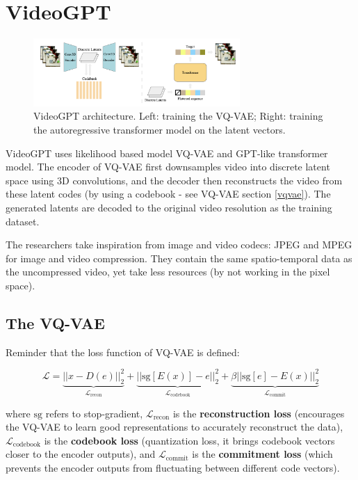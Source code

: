 \section{VideoGPT}
\label{sec:videogpt}

\begin{figure}
    \centering
    \includegraphics[width=0.7\textwidth]{images/video_gpt/architecture.png}
    \caption{VideoGPT architecture. Left: training the VQ-VAE; Right: training the autoregressive transformer model on the latent vectors.}
    \label{fig:videogpt_architecture}
\end{figure}

VideoGPT \cite{videogpt} uses likelihood based model VQ-VAE and GPT-like transformer model. The encoder of VQ-VAE first downsamples video into discrete latent space using 3D convolutions, and the decoder then reconstructs the video from these latent codes (by using a codebook - see VQ-VAE section \ref{vqvae}). The generated latents are decoded to the original video resolution as the training dataset.

The researchers take inspiration from image and video codecs: JPEG and MPEG for image and video compression. They contain the same spatio-temporal data as the uncompressed video, yet take less resources (by not working in the pixel space).

\subsection*{The VQ-VAE}

Reminder that the loss function of VQ-VAE is defined:

\begin{equation*}
    \mathcal{L} = \underbrace{\left| \left| x - D(e) \right| \right|^2_2}_{\mathcal{L}_\text{recon}} + \underbrace{\left| \left| \text{sg}\left[ E(x) \right] - e \right| \right|^2_2}_{\mathcal{L}_\text{codebook}} + \underbrace{\beta \left| \left| \text{sg}[e] - E(x) \right| \right|^2_2}_{\mathcal{L}_\text{commit}}
\end{equation*}

where $\text{sg}$ refers to stop-gradient, $\mathcal{L}_\text{recon}$ is the \textbf{reconstruction loss} (encourages the VQ-VAE to learn good representations to accurately reconstruct the data), $\mathcal{L}_\text{codebook}$ is the \textbf{codebook loss} (quantization loss, it brings codebook vectors closer to the encoder outputs), and $\mathcal{L}_\text{commit}$ is the \textbf{commitment loss} (which prevents the encoder outputs from fluctuating between different code vectors). 

